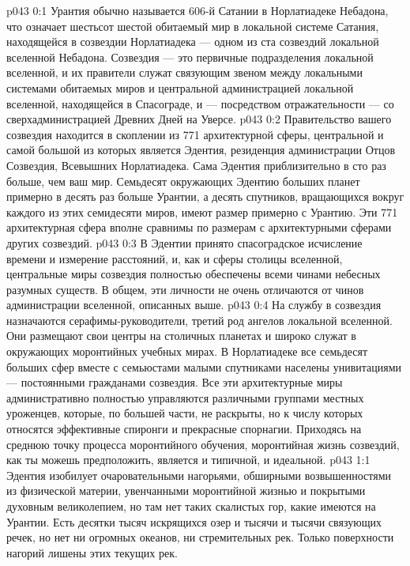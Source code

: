\author{Малаватия Мелхиседек}
\vs p043 0:1 Урантия обычно называется 606\hyp{}й Сатании в Норлатиадеке Небадона, что означает шестьсот шестой обитаемый мир в локальной системе Сатания, находящейся в созвездии Норлатиадека --- одном из ста созвездий локальной вселенной Небадона. Созвездия --- это первичные подразделения локальной вселенной, и их правители служат связующим звеном между локальными системами обитаемых миров и центральной администрацией локальной вселенной, находящейся в Спасограде, и --- посредством отражательности --- со сверхадминистрацией Древних Дней на Уверсе.
\vs p043 0:2 \pc Правительство вашего созвездия находится в скоплении из 771 архитектурной сферы, центральной и самой большой из которых является Эдентия, резиденция администрации Отцов Созвездия, Всевышних Норлатиадека. Сама Эдентия приблизительно в сто раз больше, чем ваш мир. Семьдесят окружающих Эдентию больших планет примерно в десять раз больше Урантии, а десять спутников, вращающихся вокруг каждого из этих семидесяти миров, имеют размер примерно с Урантию. Эти 771 архитектурная сфера вполне сравнимы по размерам с архитектурными сферами других созвездий.
\vs p043 0:3 \pc В Эдентии принято спасоградское исчисление времени и измерение расстояний, и, как и сферы столицы вселенной, центральные миры созвездия полностью обеспечены всеми чинами небесных разумных существ. В общем, эти личности не очень отличаются от чинов администрации вселенной, описанных выше.
\vs p043 0:4 На службу в созвездия назначаются серафимы\hyp{}руководители, третий род ангелов локальной вселенной. Они размещают свои центры на столичных планетах и широко служат в окружающих моронтийных учебных мирах. В Норлатиадеке все семьдесят больших сфер вместе с семьюстами малыми спутниками населены унивитациями --- постоянными гражданами созвездия. Все эти архитектурные миры административно полностью управляются различными группами местных уроженцев, которые, по большей части, не раскрыты, но к числу которых относятся эффективные спиронги и прекрасные спорнагии. Приходясь на среднюю точку процесса моронтийного обучения, моронтийная жизнь созвездий, как ты можешь предположить, является и типичной, и идеальной.
\vs p043 1:1 Эдентия изобилует очаровательными нагорьями, обширными возвышенностями из физической материи, увенчанными моронтийной жизнью и покрытыми духовным великолепием, но там нет таких скалистых гор, какие имеются на Урантии. Есть десятки тысяч искрящихся озер и тысячи и тысячи связующих речек, но нет ни огромных океанов, ни стремительных рек. Только поверхности нагорий лишены этих текущих рек.
